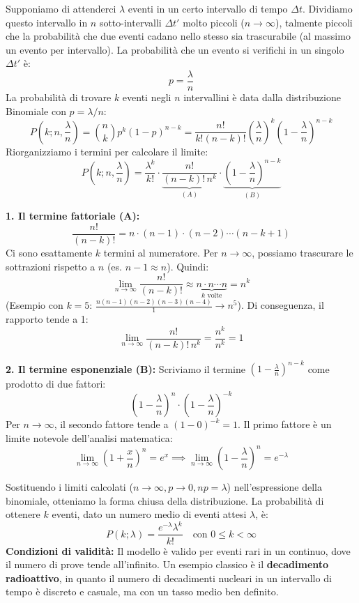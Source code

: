\documentclass[openany,a4paper,12pt]{book}
\theoremstyle{remark}
\begin{document}
Supponiamo di attenderci $\lambda$ eventi in un certo intervallo di tempo $\Delta t$. Dividiamo questo intervallo in $n$ sotto-intervalli $\Delta t'$ molto piccoli ($n \to \infty$), talmente piccoli che la probabilità che due eventi cadano nello stesso sia trascurabile (al massimo un evento per intervallo).
La probabilità che un evento si verifichi in un singolo $\Delta t'$ è:
\[
p = \frac{\lambda}{n}
\]
La probabilità di trovare $k$ eventi negli $n$ intervallini è data dalla distribuzione Binomiale con $p = \lambda/n$:
\[
P\left(k; n, \frac{\lambda}{n}\right) = \binom{n}{k} p^k (1-p)^{n-k} = \frac{n!}{k!(n-k)!} \left(\frac{\lambda}{n}\right)^k \left(1 - \frac{\lambda}{n}\right)^{n-k}
\]
Riorganizziamo i termini per calcolare il limite:
\[
P\left(k; n, \frac{\lambda}{n}\right) = \frac{\lambda^k}{k!} \cdot \underbrace{\frac{n!}{(n-k)! \, n^k}}_{(A)} \cdot \underbrace{\left(1 - \frac{\lambda}{n}\right)^{n-k}}_{(B)}
\]

\textbf{1. Il termine fattoriale (A):}
\[
\frac{n!}{(n-k)!} = n \cdot (n-1) \cdot (n-2) \cdots (n-k+1)
\]
Ci sono esattamente $k$ termini al numeratore. Per $n \to \infty$, possiamo trascurare le sottrazioni rispetto a $n$ (es. $n-1 \approx n$). Quindi:
\[
\lim_{n \to \infty} \frac{n!}{(n-k)!} \approx \underbrace{n \cdot n \cdots n}_{k \text{ volte}} = n^k
\]
(Esempio con $k=5$: $\frac{n(n-1)(n-2)(n-3)(n-4)}{1} \to n^5$).
Di conseguenza, il rapporto tende a 1:
\[
\lim_{n \to \infty} \frac{n!}{(n-k)! \, n^k} = \frac{n^k}{n^k} = 1
\]

\textbf{2. Il termine esponenziale (B):}
Scriviamo il termine $\left(1 - \frac{\lambda}{n}\right)^{n-k}$ come prodotto di due fattori:
\[
\left(1 - \frac{\lambda}{n}\right)^{n} \cdot \left(1 - \frac{\lambda}{n}\right)^{-k}
\]
Per $n \to \infty$, il secondo fattore tende a $(1-0)^{-k} = 1$.
Il primo fattore è un limite notevole dell'analisi matematica:
\[
\lim_{n \to \infty} \left(1 + \frac{x}{n}\right)^n = e^x \implies \lim_{n \to \infty} \left(1 - \frac{\lambda}{n}\right)^n = e^{-\lambda}
\]

Sostituendo i limiti calcolati ($n \to \infty, p \to 0, np=\lambda$) nell'espressione della binomiale, otteniamo la forma chiusa della distribuzione.
La probabilità di ottenere $k$ eventi, dato un numero medio di eventi attesi $\lambda$, è:
\begin{equation}
\boxed{P(k; \lambda) = \frac{e^{-\lambda} \lambda^k}{k!} \quad \text{con } 0 \le k < \infty}
\end{equation}
\textbf{Condizioni di validità:} Il modello è valido per eventi rari in un continuo, dove il numero di prove tende all'infinito.
Un esempio classico è il \textbf{decadimento radioattivo}, in quanto il numero di decadimenti nucleari in un intervallo di tempo è discreto e casuale, ma con un tasso medio ben definito.
\end{document}
